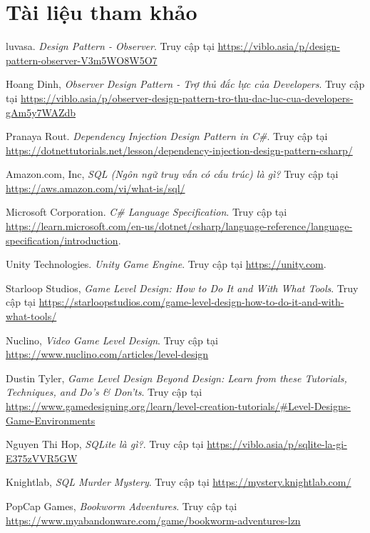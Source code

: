 \section{Tài liệu tham khảo}
\begin{thebibliography}{1}
		
	 luvasa. \textit{Design Pattern - Observer}. Truy cập tại \url{https://viblo.asia/p/design-pattern-observer-V3m5WO8W5O7}
	
	 Hoang Dinh, \textit{
	Observer Design Pattern - Trợ thủ đắc lực của Developers}. Truy cập tại
	\url{https://viblo.asia/p/observer-design-pattern-tro-thu-dac-luc-cua-developers-gAm5y7WAZdb}

	
	 Pranaya Rout. \textit{Dependency Injection Design Pattern in C\#}. Truy cập tại \url{https://dotnettutorials.net/lesson/dependency-injection-design-pattern-csharp/}
	
	 Amazon.com, Inc, \textit{
	SQL (Ngôn ngữ truy vấn có cấu trúc) là gì?} Truy cập tại \url{https://aws.amazon.com/vi/what-is/sql/}
	
	Microsoft Corporation. \textit{C\# Language Specification}. Truy cập tại \url{https://learn.microsoft.com/en-us/dotnet/csharp/language-reference/language-specification/introduction}.
	
	Unity Technologies. \textit{Unity Game Engine}. Truy cập tại \url{https://unity.com}.
	
	
	 Starloop Studios, \textit{Game Level Design: How to Do It and With What Tools}. Truy cập tại \url{https://starloopstudios.com/game-level-design-how-to-do-it-and-with-what-tools/}
	
	 Nuclino, \textit{Video Game Level Design}. Truy cập tại \url{https://www.nuclino.com/articles/level-design}
	
	 Dustin Tyler, \textit{Game Level Design Beyond Design: Learn from these Tutorials, Techniques, and Do’s \& Don’ts}. Truy cập tại \url{https://www.gamedesigning.org/learn/level-creation-tutorials/#Level-Designs-Game-Environments}
	
	 Nguyen Thi Hop, \textit{SQLite là gì?}. Truy cập tại \url{https://viblo.asia/p/sqlite-la-gi-E375zVVR5GW}
	
	 Knightlab, \textit {SQL Murder Mystery}. Truy cập tại \url{https://mystery.knightlab.com/}
	
	 PopCap Games, \textit{Bookworm Adventures}. Truy cập tại \url{https://www.myabandonware.com/game/bookworm-adventures-lzn}
	

\end{thebibliography}
